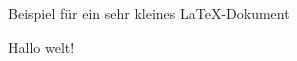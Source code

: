 \documentclass{article}
\begin{document}
Beispiel f\"ur ein sehr \tiny{kleines} \normalsize \LaTeX-Dokument

Hallo welt!
\end{document}
